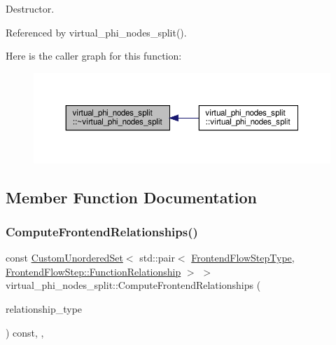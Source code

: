 Destructor. 



Referenced by virtual\+\_\+phi\+\_\+nodes\+\_\+split().

Here is the caller graph for this function\+:
\nopagebreak
\begin{figure}[H]
\begin{center}
\leavevmode
\includegraphics[width=350pt]{df/d2f/classvirtual__phi__nodes__split_a0411a0f0626a45e05e6eb43d67880cc8_icgraph}
\end{center}
\end{figure}


\subsection{Member Function Documentation}
\mbox{\label{classvirtual__phi__nodes__split_ab462ea81dbc8a5df62b618c58387061c}} 
\subsubsection{\texorpdfstring{Compute\+Frontend\+Relationships()}{ComputeFrontendRelationships()}}
{\footnotesize\ttfamily const \hyperlink{classCustomUnorderedSet}{Custom\+Unordered\+Set}$<$ std\+::pair$<$ \hyperlink{frontend__flow__step_8hpp_afeb3716c693d2b2e4ed3e6d04c3b63bb}{Frontend\+Flow\+Step\+Type}, \hyperlink{classFrontendFlowStep_af7cf30f2023e5b99e637dc2058289ab0}{Frontend\+Flow\+Step\+::\+Function\+Relationship} $>$ $>$ virtual\+\_\+phi\+\_\+nodes\+\_\+split\+::\+Compute\+Frontend\+Relationships (\begin{DoxyParamCaption}\item[{const \hyperlink{classDesignFlowStep_a723a3baf19ff2ceb77bc13e099d0b1b7}{Design\+Flow\+Step\+::\+Relationship\+Type}}]{relationship\+\_\+type }\end{DoxyParamCaption}) const\hspace{0.3cm}{\ttfamily [override]}, {\ttfamily [private]}, {\ttfamily [virtual]}}



